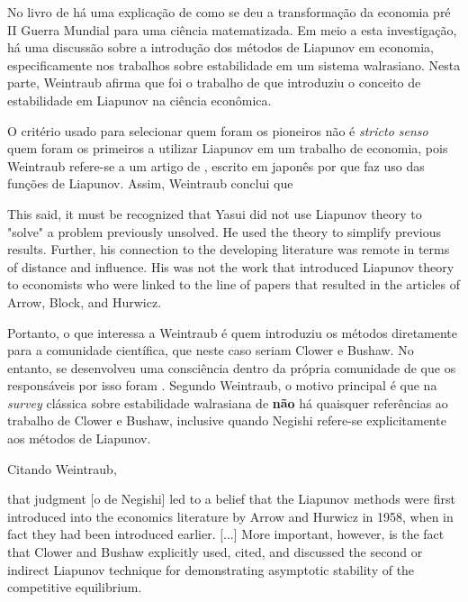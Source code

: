 \documentclass[
	12pt,				%
	openright,			%
	twoside,			%
	a4paper,			%
	english,			%
	french,				%
	spanish,			%
	brazil				%
	]{abntex2}
\begin{document}
No livro de  há uma explicação de
como se deu a transformação da economia pré II Guerra Mundial para uma ciência
matematizada. Em meio a esta investigação, há uma discussão sobre a introdução
dos métodos de Liapunov em economia, especificamente nos trabalhos sobre
estabilidade em um sistema walrasiano. Nesta parte, Weintraub afirma que foi o
trabalho de  que introduziu o conceito de
estabilidade em Liapunov na ciência econômica.

O critério usado para selecionar quem foram os pioneiros não é
\textit{stricto senso} quem foram os primeiros a utilizar Liapunov em um trabalho de
economia, pois Weintraub refere-se a um artigo de \citeyear{yasui1950}, escrito em
japonês por  que faz uso das funções de Liapunov. Assim,
Weintraub conclui que

\begin{citacao}[english]
	This said, it must be recognized that Yasui did not use Liapunov theory
	to "solve" a problem previously unsolved. He used the theory to simplify
	previous results. Further, his connection to the developing literature was
	remote in terms of distance and influence. His was not the work that
	introduced Liapunov theory to economists who were linked to the line of
	papers that resulted in the articles of Arrow, Block, and Hurwicz. \cite[p. 89]{weintraub1991}
\end{citacao}

Portanto, o que interessa a Weintraub é quem introduziu os métodos diretamente
para a comunidade científica, que neste caso seriam Clower e Bushaw. No entanto,
se desenvolveu uma consciência dentro da própria comunidade de que os
responsáveis por isso foram . Segundo
Weintraub, o motivo principal é que na \textit{survey} clássica sobre
estabilidade walrasiana de  \textbf{não} há quaisquer
referências ao trabalho de Clower e Bushaw, inclusive quando Negishi refere-se
explicitamente aos métodos de Liapunov.

Citando Weintraub,

\begin{citacao}[english]
[...] that judgment [o de Negishi] led to a belief that the Liapunov methods
were first introduced into the economics literature by Arrow and Hurwicz in
1958,  when in fact they had been introduced earlier. [...] More
important, however, is the fact that Clower and Bushaw explicitly used,
cited, and discussed the second or indirect Liapunov technique for demonstrating
asymptotic stability of the competitive equilibrium.
\cite[p. 136-7]{weintraub1991}
\end{citacao}
\end{document}
